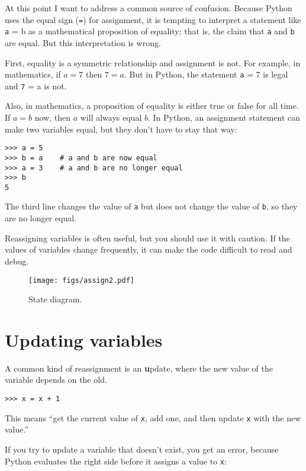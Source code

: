 \documentclass[
DIV=11,
fontsize=13,
twoside,
headinclude=false,
titlepage=firstiscover,
abstract=true,
headsepline=true,
footsepline=true,
chapterprefix=true, %
headings=big,
bibliography=totoc,%
captions=tableheading
]{scrbook}
\theoremstyle{definition}
\begin{document}
At this point I want to address a common source of
confusion.
Because Python uses the equal sign ({\texttt =}) for assignment, it is
tempting to interpret a statement like {\texttt a = b} as a
mathematical
proposition of equality; that is, the claim that {\texttt a} and
{\texttt b} are equal.  But this interpretation is wrong.

First, equality is a symmetric relationship and assignment is not.  For
example, in mathematics, if $a=7$ then $7=a$.  But in Python, the
statement {\texttt a = 7} is legal and {\texttt 7 = a} is not.

Also, in mathematics, a proposition of equality is either true or
false for all time.  If $a=b$ now, then $a$ will always equal $b$.
In Python, an assignment statement can make two variables equal, but
they don't have to stay that way:

\begin{lstlisting}
>>> a = 5
>>> b = a    # a and b are now equal
>>> a = 3    # a and b are no longer equal
>>> b
5
\end{lstlisting}
%
The third line changes the value of {\texttt a} but does not change the
value of {\texttt b}, so they are no longer equal. 

Reassigning variables is often useful, but you should use it
with caution.  If the values of variables change frequently, it can
make the code difficult to read and debug.

\begin{figure}
\centerline
{\texttt{[image: figs/assign2.pdf]}}
\caption{State diagram.}
\label{fig.assign2}
\end{figure}



\section{Updating variables}
\label{update}


A common kind of reassignment is an {\textbf update},
where the new value of the variable depends on the old.

\begin{lstlisting}
>>> x = x + 1
\end{lstlisting}
%
This means ``get the current value of {\texttt x}, add one, and then
update {\texttt x} with the new value.''

If you try to update a variable that doesn't exist, you get an
error, because Python evaluates the right side before it assigns
a value to {\texttt x}:
\end{document}
